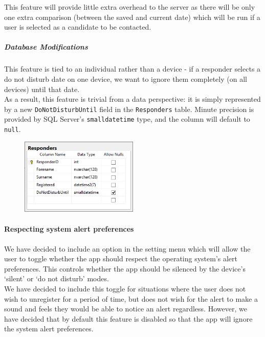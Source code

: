 \documentclass{article}
\begin{document}
This feature will provide little extra overhead to the server as there will be only one extra comparison (between the saved and current date) which will be run if a user is selected as a candidate to be contacted.

\subparagraph{Database Modifications}
This feature is tied to an individual rather than a device - if a responder selects a do not disturb date on one device, we want to ignore them completely (on all devices) until that date.\\

As a result, this feature is trivial from a data perspective: it is simply represented by a new \texttt{\color{OliveGreen}DoNotDisturbUntil} field in the \texttt{\color{OliveGreen}Responders} table. Minute precision is provided by SQL Server’s \texttt{\color{OliveGreen}smalldatetime} type, and the column will default to \texttt{\color{OliveGreen}null}.

	\begin{figure}[H]
		\centering
		\includegraphics[width=0.5\textwidth]{"Iteration5/iteration-5-dnd"}
	\end{figure}

\paragraph{Respecting system alert preferences}
We have decided to include an option in the setting menu which will allow the user to toggle whether the app should respect the operating system’s alert preferences. This controls whether the app should be silenced by the device’s ‘silent’ or ‘do not disturb’ modes.\\

We have decided to include this toggle for situations where the user does not wish to unregister for a period of time, but does not wish for the alert to make a sound and feels they would be able to notice an alert regardless. However, we have decided that by default this feature is disabled so that the app will ignore the system alert preferences.\\
\end{document}
